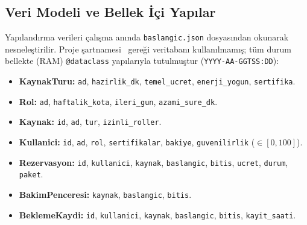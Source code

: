 \documentclass[conference]{IEEEtran}
\begin{document}
\subsection{Veri Modeli ve Bellek İçi Yapılar}
Yapılandırma verileri çalışma anında \texttt{baslangic.json} dosyasından okunarak nesneleştirilir. Proje şartnamesi~\cite{yazlab2026} gereği veritabanı kullanılmamış; tüm durum bellekte (RAM) \texttt{@dataclass} yapılarıyla tutulmuştur (\texttt{YYYY-AA-GGTSS:DD}):
\begin{itemize}\raggedright
    \item \textbf{KaynakTuru:} \texttt{ad}, \texttt{hazirlik\_dk}, \texttt{temel\_ucret}, \texttt{enerji\_yogun}, \texttt{sertifika}.
    \item \textbf{Rol:} \texttt{ad}, \texttt{haftalik\_kota}, \texttt{ileri\_gun}, \texttt{azami\_sure\_dk}.
    \item \textbf{Kaynak:} \texttt{id}, \texttt{ad}, \texttt{tur}, \texttt{izinli\_roller}.
    \item \textbf{Kullanici:} \texttt{id}, \texttt{ad}, \texttt{rol}, \texttt{sertifikalar}, \texttt{bakiye}, \texttt{guvenilirlik} ($\in [0, 100]$).
    \item \textbf{Rezervasyon:} \texttt{id}, \texttt{kullanici}, \texttt{kaynak}, \texttt{baslangic}, \texttt{bitis}, \texttt{ucret}, \texttt{durum}, \texttt{paket}.
    \item \textbf{BakimPenceresi:} \texttt{kaynak}, \texttt{baslangic}, \texttt{bitis}.
    \item \textbf{BeklemeKaydi:} \texttt{id}, \texttt{kullanici}, \texttt{kaynak}, \texttt{baslangic}, \texttt{bitis}, \texttt{kayit\_saati}.
\end{itemize}
\end{document}
